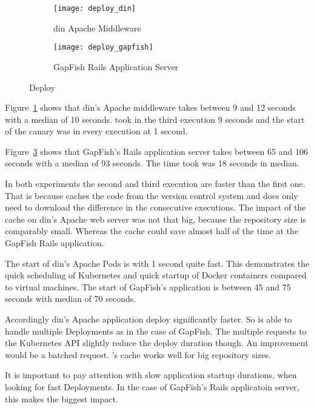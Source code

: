 \begin{figure}[htbp]
  \label{fig:deploy}
  \centering
  \begin{subfigure}{.5\textwidth}
    \texttt{[image: deploy\_din]}
    \caption{\gls{din} Apache Middleware}
    \label{fig:deploy_din}
  \end{subfigure}%
  \begin{subfigure}{.5\textwidth}
    \texttt{[image: deploy\_gapfish]}
    \caption[GapFish]{GapFish Rails Application Server}
    \label{fig:deploy_gapfish}
  \end{subfigure}
  \caption{Deploy}
\end{figure}

Figure~\ref{fig:deploy_din} shows that \gls{din}'s Apache middleware takes between 9 and 12
seconds with a median of 10 seconds. \deployer took in the third execution 9 seconds and
the start of the canary was in every execution at 1 second.

Figure~\ref{fig:deploy_gapfish} shows that GapFish's Rails application server takes
between 65 and 106 seconds with a median of 93 seconds. The time \deployer took was 18
seconds in median.

In both experiments the second and third execution are faster than the first one. That is
because \deployer caches the code from the version control system and does only need to
download the difference in the consecutive executions. The impact of the cache on \gls{din}'s
Apache web server was not that big, because the repository size is comparably
small. Whereas the cache could save almost half of the time at the GapFish Rails
application.

The start of \gls{din}'s Apache Pods is with 1 second quite fast. This demonstrates the quick
scheduling of Kubernetes and quick startup of Docker containers compared to virtual
machines. The start of GapFish's application is between 45 and 75 seconds with median of
70 seconds.

Accordingly \gls{din}'s Apache application deploy significantly faster. So \deployer is able to
handle multiple Deployments as in the case of GapFish. The multiple requests to the
Kubernetes API slightly reduce the deploy duration though. An improvement would be a
batched request. \deployer's cache works well for big repository sizes.

It is important to pay attention with slow application startup durations, when looking for
fast Deployments. In the case of GapFish's Rails applicatoin server, this makes the
biggest impact.

